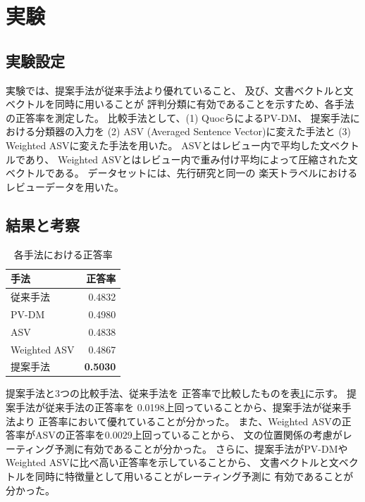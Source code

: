 \documentclass{ttisummary}
\begin{document}
\section{実験}

\subsection{実験設定}

実験では、提案手法が従来手法より優れていること、
及び、文書ベクトルと文ベクトルを同時に用いることが
評判分類に有効であることを示すため、各手法の正答率を測定した。
比較手法として、(1) Quocら\cite{quoc14}によるPV-DM、
提案手法における分類器の入力を
(2) ASV (Averaged Sentence Vector)に変えた手法と
(3) Weighted ASVに変えた手法を用いた。
ASVとはレビュー内で平均した文ベクトルであり、
Weighted ASVとはレビュー内で重み付け平均によって圧縮された文ベクトルである。
データセットには、先行研究\cite{fujitani15}と同一の
楽天トラベルにおけるレビューデータを用いた。

\subsection{結果と考察}

\begin{table}[b!]
  \caption{各手法における正答率}
  \centering
  \begin{tabular}{l | r} \label{tab:Accuracies}
    手法 & 正答率 \\
    \hline
    従来手法\cite{fujitani15}  & 0.4832 \\
    PV-DM & 0.4980 \\
    ASV & 0.4838 \\
    Weighted ASV & 0.4867 \\
    提案手法 & \textbf{0.5030} \\
  \end{tabular}
\end{table}

提案手法と3つの比較手法、従来手法\cite{fujitani15}を
正答率で比較したものを表\ref{tab:Accuracies}に示す。
提案手法が従来手法\cite{fujitani15}の正答率を
0.0198上回っていることから、提案手法が従来手法\cite{fujitani15}より
正答率において優れていることが分かった。
また、Weighted ASVの正答率がASVの正答率を0.0029上回っていることから、
文の位置関係の考慮がレーティング予測に有効であることが分かった。
さらに、提案手法がPV-DMやWeighted ASVに比べ高い正答率を示していることから、
文書ベクトルと文ベクトルを同時に特徴量として用いることがレーティング予測に
有効であることが分かった。
\end{document}
